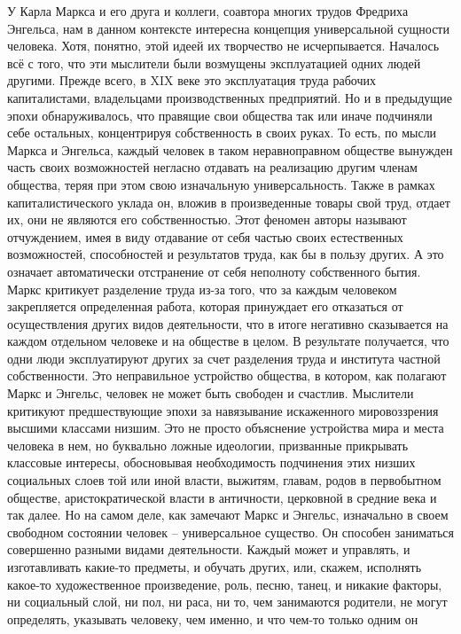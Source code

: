 У Карла Маркса и его друга и коллеги, соавтора многих
трудов Фредриха Энгельса, нам в данном контексте интересна концепция
универсальной сущности человека. Хотя, понятно, этой идеей их творчество не
исчерпывается. Началось всё с того, что эти мыслители были возмущены
эксплуатацией одних людей другими. Прежде всего, в XIX веке это эксплуатация
труда рабочих капиталистами, владельцами производственных предприятий. Но и в
предыдущие эпохи обнаруживалось, что правящие свои общества так или иначе
подчиняли себе остальных, концентрируя собственность в своих руках. То есть, по
мысли Маркса и Энгельса, каждый человек в таком неравноправном обществе вынужден
часть своих возможностей негласно отдавать на реализацию другим членам общества,
теряя при этом свою изначальную универсальность. Также в рамках
капиталистического уклада он, вложив в произведенные товары свой труд, отдает
их, они не являются его собственностью. Этот феномен авторы называют
отчуждением, имея в виду отдавание от себя частью своих естественных
возможностей, способностей и результатов труда, как бы в пользу других. А это
означает автоматически отстранение от себя неполноту собственного бытия. Маркс
критикует разделение труда из-за того, что за каждым человеком закрепляется
определенная работа, которая принуждает его отказаться от осуществления других
видов деятельности, что в итоге негативно сказывается на каждом отдельном
человеке и на обществе в целом. В результате получается, что одни люди
эксплуатируют других за счет разделения труда и института частной собственности.
Это неправильное устройство общества, в котором, как полагают Маркс и Энгельс,
человек не может быть свободен и счастлив. Мыслители критикуют предшествующие
эпохи за навязывание искаженного мировоззрения высшими классами низшим. Это не
просто объяснение устройства мира и места человека в нем, но буквально ложные
идеологии, призванные прикрывать классовые интересы, обосновывая необходимость
подчинения этих низших социальных слоев той или иной власти, выжитям, главам,
родов в первобытном обществе, аристократической власти в античности, церковной в
средние века и так далее. Но на самом деле, как замечают Маркс и Энгельс,
изначально в своем свободном состоянии человек – универсальное существо. Он
способен заниматься совершенно разными видами деятельности. Каждый может и
управлять, и изготавливать какие-то предметы, и обучать других, или, скажем,
исполнять какое-то художественное произведение, роль, песню, танец, и никакие
факторы, ни социальный слой, ни пол, ни раса, ни то, чем занимаются родители, не
могут определять, указывать человеку, чем именно, и что чем-то только одним он
